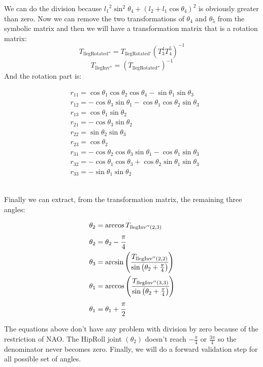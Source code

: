 We can do the division because ${l_1}^2\sin^2\theta_4 + \left(l_2 + l_1\cos\theta_4\right)^2$ is obviously greater than zero. 
Now we can remove the two transformations of $\theta_4$ and $\theta_5$ from the symbolic matrix and then we will have a transformation matrix that is a rotation matrix:
\[
T_{\text{llegRotated}''} = T_{\text{llegRotated}'}\left(T^4_3T^5_4\right)^{-1}
\]
\[
T_{\text{llegInv}''} = \left(T_{\text{llegRotated}''}\right)^{-1}
\]
And the rotation part is:
\begin{small}
\begin{align*}
&r_{11} = \cos\theta_1\cos\theta_2\cos\theta_4 - \sin\theta_1\sin\theta_3\\
&r_{12} = -\cos\theta_3\sin\theta_1 - \cos\theta_1\cos\theta_2\sin\theta_3\\
&r_{13} = \cos\theta_1\sin\theta_2 \\
&r_{21} = -\cos\theta_3\sin\theta_2\\
&r_{22} = \sin\theta_2\sin\theta_3\\
&r_{23} = \cos\theta_2\\
&r_{31} = -\cos\theta_2\cos\theta_3\sin\theta_1 - \cos\theta_1\sin\theta_3\\
&r_{32} = -\cos\theta_1\cos\theta_3 + \cos\theta_2\sin\theta_1\sin\theta_3\\
&r_{33} = -\sin\theta_1\sin\theta_2
\end{align*}
\end{small}\\
Finally we can extract, from the transformation matrix, the remaining three angles:
\begin{small}
\begin{align*}
\theta_2 &= \arccos T_{\text{llegInv}''(2,3)}\\
\theta_2 &= \theta_2 - \cfrac{\pi}{4}\\
\theta_3 &= \arcsin\left(\cfrac{T_{\text{llegInv}''(2,2)}}{\sin\left(\theta_2+\frac{\pi}{4}\right)}\right)\\
\theta_1 &= \arccos\left(\cfrac{T_{\text{llegInv}''(3,3)}}{\sin\left(\theta_2+\frac{\pi}{4}\right)}\right)\\
\theta_1 &= \theta_1 + \cfrac{\pi}{2}
\end{align*}
\end{small}
The equations above don't have any problem with division by zero because of the restriction of NAO. The HipRoll joint $(\theta_2)$ doesn't reach $-\frac{\pi}{4}$ or $\frac{3\pi}{4}$ so the denominator never becomes zero. Finally, we will do a forward validation step for all possible set of angles.
